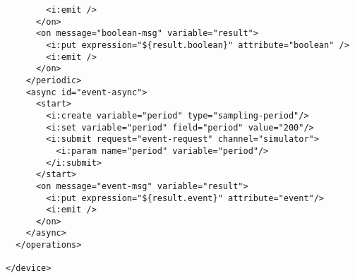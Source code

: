 \begin{lstlisting}
        <i:emit />
      </on>
      <on message="boolean-msg" variable="result">
        <i:put expression="${result.boolean}" attribute="boolean" />
        <i:emit />
      </on>
    </periodic>
    <async id="event-async">
      <start>
        <i:create variable="period" type="sampling-period"/>
        <i:set variable="period" field="period" value="200"/>
        <i:submit request="event-request" channel="simulator">
          <i:param name="period" variable="period"/>
        </i:submit>
      </start>
      <on message="event-msg" variable="result">
        <i:put expression="${result.event}" attribute="event"/>
        <i:emit />
      </on>
    </async>
  </operations>

</device>
\end{lstlisting}

